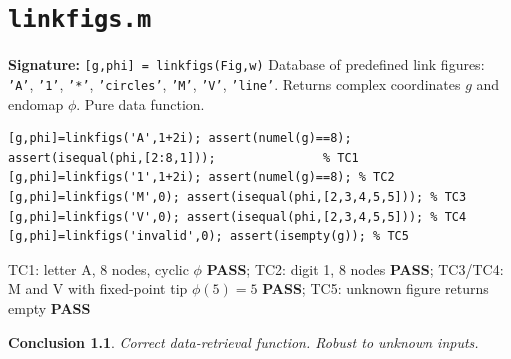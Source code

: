 \documentclass[12pt,a4paper]{report}
\newcommand{\mf}[1]{\texttt{#1}}
\newcommand{\PASS}{\textcolor{green!60!black}{\textbf{PASS}}}
\newtheorem{concl}{Conclusion}[chapter]
\begin{document}
\chapter{\mf{linkfigs.m}}
\begin{tcolorbox}[Abox,title=Analysis]
\textbf{Signature:} \lstinline|[g,phi] = linkfigs(Fig,w)|\quad
Database of predefined link figures: \texttt{'A'}, \texttt{'1'}, \texttt{'*'}, \texttt{'circles'}, \texttt{'M'}, \texttt{'V'}, \texttt{'line'}. Returns complex coordinates $g$ and endomap $\phi$. Pure data function.
\end{tcolorbox}
\begin{lstlisting}[caption={Tests for linkfigs.m}]
[g,phi]=linkfigs('A',1+2i); assert(numel(g)==8);
assert(isequal(phi,[2:8,1]));               % TC1
[g,phi]=linkfigs('1',1+2i); assert(numel(g)==8); % TC2
[g,phi]=linkfigs('M',0); assert(isequal(phi,[2,3,4,5,5])); % TC3
[g,phi]=linkfigs('V',0); assert(isequal(phi,[2,3,4,5,5])); % TC4
[g,phi]=linkfigs('invalid',0); assert(isempty(g)); % TC5
\end{lstlisting}
\begin{tcolorbox}[Pbox,title=TC1--TC5 -- All pass]
TC1: letter A, 8 nodes, cyclic $\phi$ \PASS; TC2: digit 1, 8 nodes \PASS; TC3/TC4: M and V with fixed-point tip $\phi(5)=5$ \PASS; TC5: unknown figure returns empty \PASS
\end{tcolorbox}
\begin{concl}
Correct data-retrieval function. Robust to unknown inputs.
\end{concl}

\end{document}
